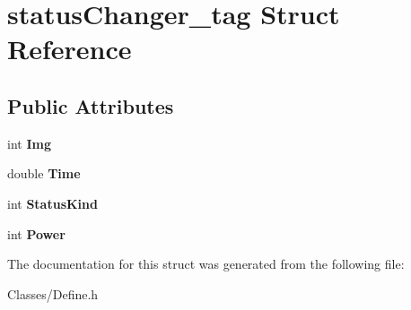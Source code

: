 \hypertarget{structstatus_changer__tag}{}\section{status\+Changer\+\_\+tag Struct Reference}
\label{structstatus_changer__tag}
\subsection*{Public Attributes}
\begin{DoxyCompactItemize}
\item 
int {\bfseries Img}\hypertarget{structstatus_changer__tag_a6082189f596075c2c27c72a22f35dc12}{}\label{structstatus_changer__tag_a6082189f596075c2c27c72a22f35dc12}

\item 
double {\bfseries Time}\hypertarget{structstatus_changer__tag_a423795cf8f6e0298eba6badf5ab0a7b8}{}\label{structstatus_changer__tag_a423795cf8f6e0298eba6badf5ab0a7b8}

\item 
int {\bfseries Status\+Kind}\hypertarget{structstatus_changer__tag_a68bed5d94327f1f3a7638c80c7b76448}{}\label{structstatus_changer__tag_a68bed5d94327f1f3a7638c80c7b76448}

\item 
int {\bfseries Power}\hypertarget{structstatus_changer__tag_abd9ff21ed0f7a75fc9eafa149352447e}{}\label{structstatus_changer__tag_abd9ff21ed0f7a75fc9eafa149352447e}

\end{DoxyCompactItemize}


The documentation for this struct was generated from the following file\+:\begin{DoxyCompactItemize}
\item 
Classes/Define.\+h\end{DoxyCompactItemize}
